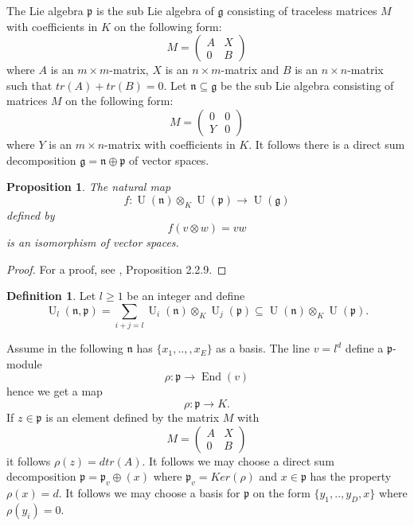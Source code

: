 \documentclass{amsart}
\theoremstyle{plain}
\newtheorem{proposition}[theorem]{Proposition}
\theoremstyle{definition}
\newtheorem{definition}[theorem]{Definition}
\theoremstyle{remark}
\numberwithin{equation}{theorem}
\begin{document}
The Lie algebra ${\mathfrak{p}}$ is the sub Lie algebra of ${\mathfrak{g}}$
consisting of traceless matrices $M$ with coefficients in $K$ on the following form:
\[M=
\begin{pmatrix}  A & X \\
                 0 & B \end{pmatrix} 
\]
where $A$ is an $m\times m$-matrix, $X$ is an
$n\times m$-matrix and $B$ is an $n\times n$-matrix 
such that $tr(A)+tr(B)=0$. 
Let ${\mathfrak{n}} \subseteq {\mathfrak{g}}$ be the sub Lie algebra consisting of matrices
$M$ on the following form:
\[M=
\begin{pmatrix}  0 & 0 \\
                 Y & 0 \end{pmatrix}
\]
where $Y$ is an $m\times n$-matrix with coefficients in $K$. It
follows there is a direct sum decomposition ${\mathfrak{g}}={\mathfrak{n}}\oplus {\mathfrak{p}}$ of
vector spaces. 

\begin{proposition} The natural map
\[ f:{\operatorname{U}}({\mathfrak{n}})\otimes_K {\operatorname{U}}({\mathfrak{p}})\rightarrow {\operatorname{U}}({\mathfrak{g}}) \]
defined by
\[ f(v\otimes w)=vw \]
is an isomorphism of vector spaces.
\end{proposition}
\begin{proof} For a proof, see \cite{dixmier}, Proposition 2.2.9.
\end{proof}

\begin{definition} Let $l\geq 1$ be an integer and define
\[ {\operatorname{U}}_l({\mathfrak{n}},{\mathfrak{p}})=\sum_{i+j=l}{\operatorname{U}}_i({\mathfrak{n}})\otimes_K {\operatorname{U}}_j({\mathfrak{p}})\subseteq
{\operatorname{U}}({\mathfrak{n}})\otimes_K {\operatorname{U}}({\mathfrak{p}}) .\]
\end{definition}

Assume in the following ${\mathfrak{n}}$ has $\{x_1,..,,x_E\}$ as a basis.
The line $v=l^d$ define a ${\mathfrak{p}}$-module
\[ \rho:{\mathfrak{p}}\rightarrow {\operatorname{End} }(v) \]
hence we get a map
\[ \rho:{\mathfrak{p}} \rightarrow K .\]
If $z\in {\mathfrak{p}}$ is an element defined by the matrix $M$ with 
\[M=
\begin{pmatrix}  A & X \\
                 0 & B \end{pmatrix}
\]
it follows $\rho(z)=dtr(A)$.
It follows we may choose a direct sum decomposition ${\mathfrak{p}}={\mathfrak{p}}_v\oplus
(x)$ where ${\mathfrak{p}}_v=Ker(\rho)$ and $x\in {\mathfrak{p}}$ has the property
$\rho(x)=d$.
It follows we may choose a basis for ${\mathfrak{p}}$ on the form
$\{y_1,..,y_D,x\}$ where $\rho(y_i)=0$.
\end{document}

